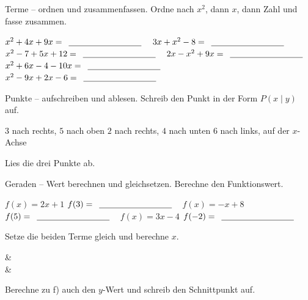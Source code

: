\begin{aufgabe}{Terme -- ordnen und zusammenfassen. Ordne nach $x^2$, dann $x$, dann
Zahl und fasse zusammen.}
\begin{teile}
\teil $x^2 + 4x + 9x = \leerfeld$
\teil $3x + x^2 - 8 = \leerfeld$
\teil $x^2 - 7 + 5x + 12 = \leerfeld$
\teil $2x - x^2 + 9x = \leerfeld$
\teil $x^2 + 6x - 4 - 10x = \leerfeld$
\teil $x^2 - 9x + 2x - 6 = \leerfeld$
\end{teile}
\end{aufgabe}

\begin{aufgabe}{Punkte -- aufschreiben und ablesen. Schreib den Punkt in der Form
$P(x \mid y)$ auf.}
\begin{teile}
\teil $3$ nach rechts, $5$ nach oben \hfill {}
\teil $2$ nach rechts, $4$ nach unten \hfill {}
\teil $6$ nach links, auf der $x$-Achse \hfill {}
\end{teile}
Lies die drei Punkte ab.

\begin{ksys}[xmin=-6,xmax=6,ymin=-5,ymax=5,ablesen]
\end{ksys}

\begin{teile}
\teil {}
\teil {}
\teil {}
\end{teile}
\end{aufgabe}

\begin{aufgabe}{Geraden -- Wert berechnen und gleichsetzen. Berechne den Funktionswert.}
\begin{teile}
\teil $f(x) = 2x + 1$ \quad $f(3) = \leerfeld$
\teil $f(x) = -x + 8$ \quad $f(5) = \leerfeld$
\teil $f(x) = 3x - 4$ \quad $f(-2) = \leerfeld$
\end{teile}
Setze die beiden Terme gleich und berechne $x$.
\begin{gleichungsraster}[3]
 &  \\
 & \\
\end{gleichungsraster}
Berechne zu f) auch den $y$-Wert und schreib den Schnittpunkt auf.
\begin{teile}
\teil {}
\end{teile}
\end{aufgabe}
